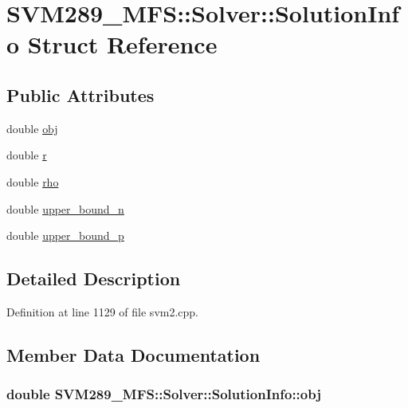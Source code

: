 \hypertarget{struct_s_v_m289___m_f_s_1_1_solver_1_1_solution_info}{}\section{S\+V\+M289\+\_\+\+M\+FS\+:\+:Solver\+:\+:Solution\+Info Struct Reference}
\label{struct_s_v_m289___m_f_s_1_1_solver_1_1_solution_info}
\subsection*{Public Attributes}
\begin{DoxyCompactItemize}
\item 
double \hyperlink{struct_s_v_m289___m_f_s_1_1_solver_1_1_solution_info_ac506f70bd4e526462a7dbe7723e73ffd}{obj}
\item 
double \hyperlink{struct_s_v_m289___m_f_s_1_1_solver_1_1_solution_info_abbbd44ea36edc2cb533a139fe3de3d7d}{r}
\item 
double \hyperlink{struct_s_v_m289___m_f_s_1_1_solver_1_1_solution_info_a7b49c6be18eba90fa20a9d0f13316d2f}{rho}
\item 
double \hyperlink{struct_s_v_m289___m_f_s_1_1_solver_1_1_solution_info_a2545a536d0eb0d1d2dc04a1402257f82}{upper\+\_\+bound\+\_\+n}
\item 
double \hyperlink{struct_s_v_m289___m_f_s_1_1_solver_1_1_solution_info_a3bd42ac9799f94148cb7b2efeffd6590}{upper\+\_\+bound\+\_\+p}
\end{DoxyCompactItemize}


\subsection{Detailed Description}


Definition at line 1129 of file svm2.\+cpp.



\subsection{Member Data Documentation}
\subsubsection[{\texorpdfstring{obj}{obj}}]{\setlength{\rightskip}{0pt plus 5cm}double S\+V\+M289\+\_\+\+M\+F\+S\+::\+Solver\+::\+Solution\+Info\+::obj}\hypertarget{struct_s_v_m289___m_f_s_1_1_solver_1_1_solution_info_ac506f70bd4e526462a7dbe7723e73ffd}{}\label{struct_s_v_m289___m_f_s_1_1_solver_1_1_solution_info_ac506f70bd4e526462a7dbe7723e73ffd}


